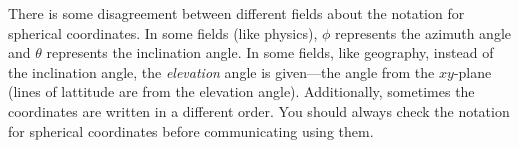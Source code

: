 %
	
There is some disagreement between different fields about the notation
for spherical coordinates.  In some fields (like physics), $\phi$
represents the azimuth angle and $\theta$ represents the inclination
angle.  In some fields, like geography, instead of the inclination angle, the
\emph{elevation} angle is given---the angle from the $xy$-plane (lines
of lattitude are from the elevation angle).
Additionally, sometimes the coordinates are written in a different
order.  You should always check the notation for spherical coordinates
before communicating using them.


\clearpage

